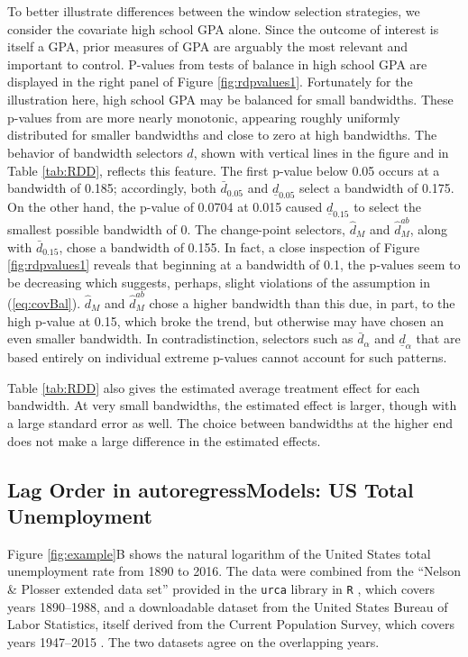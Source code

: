 \documentclass[lineno]{biometrika}\usepackage[]{graphicx}\usepackage[]{color}
\newcommand{\dalphaU}{\bar{d}_\alpha}
\newcommand{\dalphaB}{\underline{d}_\alpha}
\newcommand{\dhat}{\hat{d}}
\newcommand{\dhatU}{\bar{d}}
\newcommand{\dhatB}{\underline{d}}
\newcommand{\dhatm}{\hat{d}_M}
\newcommand{\dhatmab}{\hat{d}^{ab}_M}
\begin{document}
To better illustrate differences between the window selection
strategies, we consider the covariate high school GPA alone.
Since the outcome of interest is itself a GPA, prior measures of GPA
are arguably the most relevant and important to control.
P-values from tests of balance in high school GPA are
displayed in the right panel of Figure \ref{fig:rdpvalues1}.
Fortunately for the illustration here, high school GPA may be
balanced for small bandwidths.
These p-values from are more nearly
monotonic, appearing roughly uniformly distributed for smaller
bandwidths and close to zero at high bandwidths.
The behavior of bandwidth selectors $\dhat$, shown with vertical lines
in the figure and in Table \ref{tab:RDD}, reflects this feature.
The first p-value below 0.05 occurs at a bandwidth of
0.185; accordingly, both $\dhatU_{0.05}$ and
$\dhatB_{0.05}$ select a bandwidth of 0.175.
On the other hand, the p-value of 0.0704 at 0.015
caused $\dhatB_{0.15}$ to select the smallest possible bandwidth of 0.
The change-point selectors, $\dhatm$ and $\dhatmab$, along with
$\dhatU_{0.15}$, chose a bandwidth of 0.155.
In fact, a close inspection of Figure \ref{fig:rdpvalues1} reveals
that beginning at a bandwidth of 0.1, the p-values seem to be
decreasing which suggests, perhaps, slight violations of the assumption
in (\ref{eq:covBal}).
$\dhatm$ and $\dhatmab$ chose a higher bandwidth than this due, in
part, to the high p-value at 0.15, which broke the trend, but
otherwise may have chosen an even smaller bandwidth.
In contradistinction, selectors such as $\dalphaU$ and $\dalphaB$ that
are based entirely on individual extreme p-values cannot account for
such patterns.

Table \ref{tab:RDD} also gives the estimated average treatment effect
for each bandwidth.
At very small bandwidths, the estimated effect is larger, though with a
large standard error as well.
The choice between bandwidths at the higher end does not make a large
difference in the estimated effects.

\subsection{Lag Order in autoregressModels: US Total Unemployment}


Figure \ref{fig:example}B shows the natural logarithm of the United States total
unemployment rate from 1890 to 2016.
The data were combined from the ``Nelson \& Plosser extended data
set'' provided in the \texttt{urca} library in \texttt{R}
\citep{urca,Rcite}, which covers years 1890--1988, and a downloadable
dataset from the United States Bureau of Labor Statistics, itself
derived from the Current Population Survey, which covers years
1947--2015 \citep{cps}.
The two datasets agree on the overlapping years.
\end{document}
